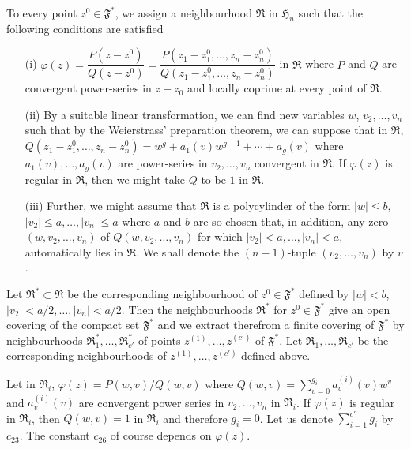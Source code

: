 To every point $z^{0}\in\mathfrak{F}^{\ast}$, we assign a
neighbourhood $\mathfrak{R}$ in $\mathfrak{H}_{n}$ such that the
following conditions are satisfied
\begin{itemize}
\item[(i)]
  $\varphi(z)=\dfrac{P(z-z^{0})}{Q(z-z^{0})}=\dfrac{P(z_{1}-z^{0}_{1},\ldots,
  z_{n}-z^{0}_{n})}{Q(z_{1}-z^{0}_{1},\ldots,z_{n}-z^{0}_{n})}$ in
  $\mathfrak{R}$ where $P$ and $Q$ are convergent power-series in
  $z-z_{0}$ and locally coprime at every point of $\mathfrak{R}$.

\item[(ii)] By a suitable linear transformation, we can find new
  variables $w$, $v_{2},\ldots,v_{n}$ such that by the Weierstrass'
  preparation theorem, we can suppose that in $\mathfrak{R}$,
  $Q(z_{1}-z^{0}_{1},\ldots,z_{n} - z^{0}_{n}) =
  w^{g}+a_{1}(v)w^{g-1}+\cdots+a_{g}(v)$\pageoriginale  
  where $a_{1}(v),\ldots,a_{g}(v)$ are  power-series in
  $v_{2},\ldots,v_{n}$ convergent in $\mathfrak{R}$. If $\varphi(z)$
  is regular in $\mathfrak{R}$, then we might take $Q$ to be $1$ in
  $\mathfrak{R}$.

\item[(iii)] Further, we might assume that $\mathfrak{R}$ is a
  polycylinder of the form $|w|\leq b$, $|v_{2}|\leq
  a,\ldots,|v_{n}|\leq a$ where $a$ and $b$ are so chosen that, in
  addition, any zero $(w,v_{2},\ldots,v_{n})$ of
  $Q(w,v_{2},\ldots,v_{n})$ for which $|v_{2}|<a,\ldots,|v_{n}|<a$,
  automatically lies in $\mathfrak{R}$. We shall denote the
  $(n-1)$-tuple $(v_{2},\ldots,v_{n})$ by $v$.
\end{itemize}

Let $\mathfrak{R}^{\ast}\subset \mathfrak{R}$ be the corresponding
neighbourhood of $z^{0}\in\mathfrak{F}^{\ast}$ defined by $|w|<b$,
$|v_{2}|<a/2,\ldots,|v_{n}|<a/2$. Then the neighbourhoods
$\mathfrak{R}^{\ast}$ for $z^{0}\in\mathfrak{F}^{\ast}$ give an open
covering of the compact set $\mathfrak{F}^{\ast}$ and we extract
therefrom a finite covering of $\mathfrak{F}^{\ast}$ by neighbourhoods
$\mathfrak{R}^{\ast}_{1},\ldots,\mathfrak{R}^{\ast}_{c'}$ of points
$z^{(1)},\ldots,z^{(c')}$ of $\mathfrak{F}^{\ast}$. Let
$\mathfrak{R}_{1},\ldots,\mathfrak{R}_{c'}$ be the corresponding
neighbourhoods of $z^{(1)},\ldots,z^{(c')}$ defined above.

Let in $\mathfrak{R}_{i}$, $\varphi(z)=P(w,v)/Q(w,v)$ where
$Q(w,v)=\sum\limits^{g_{i}}_{v=0}a^{(i)}_{v}(v)w^{v}$ and
$a^{(i)}_{v}(v)$ are convergent power series in $v_{2},\ldots,v_{n}$
in $\mathfrak{R}_{i}$. If $\varphi(z)$ is regular in
$\mathfrak{R}_{i}$, then $Q(w,v)=1$ in $\mathfrak{R}_{i}$ and
therefore $g_{i}=0$. Let us denote $\sum\limits^{c'}_{i=1}g_{i}$ by
$c_{23}$. The constant $c_{26}$ of course depends on $\varphi(z)$.

